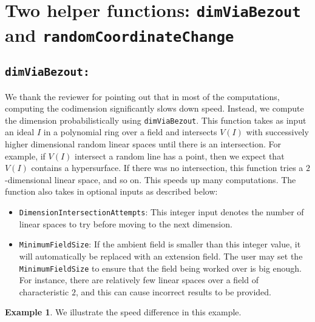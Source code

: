 \documentclass[11pt]{amsart}
\theoremstyle{definition}
\newtheorem{example}{Example}[section]
\begin{document}
\section{Two helper functions: {\tt dimViaBezout} and {\tt randomCoordinateChange}}{\label{helper}}

\subsection*{\tt dimViaBezout:} We thank the reviewer for pointing out that in most of the computations, computing the codimension significantly slows down speed. Instead, we compute the dimension probabilistically using {\tt dimViaBezout}. This function takes as input an ideal $I$ in a polynomial ring over a field and intersects $V(I)$ with successively higher dimensional random linear spaces until there is an intersection.  For example, if $V(I)$ intersect a random line has a point, then we expect that $V(I)$ contains a hypersurface.  If there was no intersection, this function tries a $2$-dimensional linear space, and so on.  This speeds up many computations. The function also takes in optional inputs as described below:

\begin{itemize}
	\item {\tt DimensionIntersectionAttempts}: 
	This integer input denotes the number of linear spaces to try before moving to the next dimension.
	\item {\tt MinimumFieldSize}:
	If the ambient field is smaller than this integer value, it will automatically be replaced with an extension field. The user may set the {\tt MinimumFieldSize} to ensure that the field being worked over is big enough.  For instance, there are relatively few linear spaces over a field of characteristic $2$, and this can cause incorrect results to be provided. 
\end{itemize}

\begin{example} We illustrate the speed difference in this example.
	{}
\end{example}
\end{document}
